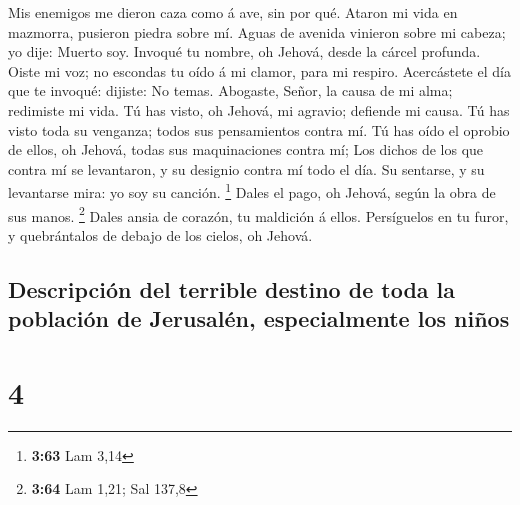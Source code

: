  Mis enemigos me dieron caza como á ave, sin por qué.
 Ataron mi vida en mazmorra, pusieron piedra sobre mí.
 Aguas de avenida vinieron sobre mi cabeza; yo dije:
Muerto soy.  Invoqué tu nombre, oh Jehová, desde la
cárcel profunda.  Oiste mi voz; no escondas tu oído á mi
clamor, para mi respiro.  Acercástete el día que te
invoqué: dijiste: No temas.  Abogaste, Señor, la causa de
mi alma; redimiste mi vida.  Tú has visto, oh Jehová, mi
agravio; defiende mi causa.  Tú has visto toda su
venganza; todos sus pensamientos contra mí.  Tú has oído
el oprobio de ellos, oh Jehová, todas sus maquinaciones contra mí;
 Los dichos de los que contra mí se levantaron, y su
designio contra mí todo el día.  Su sentarse, y su
levantarse mira: yo soy su canción. \footnote{\textbf{3:63} Lam 3,14}
 Dales el pago, oh Jehová, según la obra de sus manos.
\footnote{\textbf{3:64} Lam 1,21; Sal 137,8}  Dales ansia
de corazón, tu maldición á ellos.  Persíguelos en tu
furor, y quebrántalos de debajo de los cielos, oh Jehová.

\hypertarget{descripciuxf3n-del-terrible-destino-de-toda-la-poblaciuxf3n-de-jerusaluxe9n-especialmente-los-niuxf1os}{%
\subsection{Descripción del terrible destino de toda la población de
Jerusalén, especialmente los
niños}\label{descripciuxf3n-del-terrible-destino-de-toda-la-poblaciuxf3n-de-jerusaluxe9n-especialmente-los-niuxf1os}}

\hypertarget{section-3}{%
\section{4}\label{section-3}}

